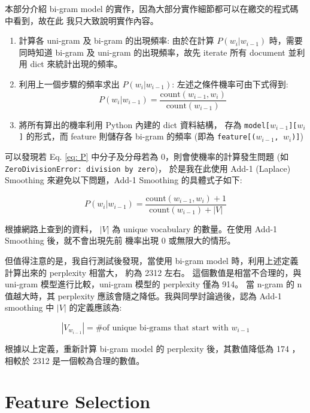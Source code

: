 \documentclass{article}[12pt]
\begin{document}
本部分介紹 bi-gram model 的實作，因為大部分實作細節都可以在繳交的程式碼中看到，故在此
我只大致說明實作內容。

\begin{enumerate}
    \item 計算各 uni-gram 及 bi-gram 的出現頻率: 由於在計算 $P(w_i|w_{i-1})$ 時，需要同時知道 bi-gram 及
    uni-gram 的出現頻率，故先 iterate 所有 document 並利用 dict 來統計出現的頻率。
    \item 利用上一個步驟的頻率求出 $P(w_i|w_{i-1})$: 左述之條件機率可由下式得到:
    \begin{equation}
        \label{eq: P}
        P(w_i|w_{i-1}) = \frac{\text{count}(w_{i-1}, w_i)}{\text{count}(w_{i-1})}
    \end{equation}
    \item 將所有算出的機率利用 Python 內建的 dict 資料結構，
    存為 \texttt{model[$w_{i-1}$][$w_i$]} 的形式，而 feature 則儲存各 bi-gram
    的頻率 (即為 \texttt{feature[($w_{i-1}$, $w_i$)]})
\end{enumerate}

可以發現若 Eq. \ref{eq: P} 中分子及分母若為 0，則會使機率的計算發生問題
(如 \texttt{ZeroDivisionError: division by zero})，
於是我在此使用 Add-1 (Laplace) Smoothing 來避免以下問題，Add-1 Smoothing 的具體式子如下:

\begin{equation}
    \label{eq: add-1}
    P(w_i|w_{i-1}) = \frac{\text{count}(w_{i-1}, w_i) + 1}{\text{count}(w_{i-1}) + |V|}
\end{equation}

根據網路上查到的資料， $|V|$ 為 unique vocabulary 的數量。在使用 Add-1 Smoothing 後，就不會出現先前
機率出現 0 或無限大的情形。

但值得注意的是，我自行測試後發現，當使用 bi-gram model 時，利用上述定義計算出來的 perplexity 相當大，
約為 2312 左右。
這個數值是相當不合理的，與 uni-gram 模型進行比較，uni-gram 模型的 perplexity 僅為 914。
當 n-gram 的 n 值越大時，其 perplexity 應該會隨之降低。我與同學討論過後，認為 Add-1 smoothing 中 $|V|$
的定義應該為:

\begin{equation}
    \label{eq: v}
    |V_{w_{i-1}}| = \text{\# of unique bi-grams that start with } w_{i-1}
\end{equation}

根據以上定義，重新計算 bi-gram model 的 perplexity 後，其數值降低為 174 ，相較於 2312 是一個較為合理的數值。

\section{Feature Selection}
\end{document}
